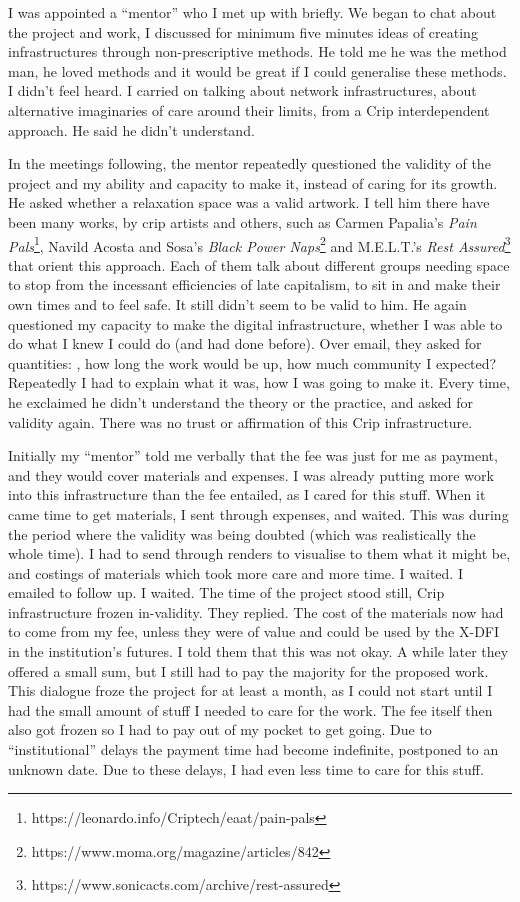 I was appointed a ``mentor'' who I met up with briefly. We began to chat
about the project and work, I discussed for minimum five minutes ideas
of creating infrastructures through non-prescriptive methods. He told me
he was the method man, he loved methods and it would be great if I could
generalise these methods. I didn't feel heard. I carried on talking
about network infrastructures, about alternative imaginaries of care
around their limits, from a Crip interdependent approach. He said he
didn't understand.

In the meetings following, the mentor repeatedly questioned the validity
of the project and my ability and capacity to make it, instead of caring
for its growth. He asked whether a relaxation space was a valid artwork.
I tell him there have been many works, by crip artists and others, such
as Carmen Papalia's \emph{Pain Pals}\footnote{https://leonardo.info/Criptech/eaat/pain-pals},
Navild Acosta and Sosa's \emph{Black Power Naps}\footnote{https://www.moma.org/magazine/articles/842}
and M.E.L.T.'s \emph{Rest Assured}\footnote{https://www.sonicacts.com/archive/rest-assured}
that orient this approach. Each of them talk about different groups
needing space to stop from the incessant efficiencies of late
capitalism, to sit in and make their own times and to feel safe. It
still didn't seem to be valid to him. He again questioned my capacity to
make the digital infrastructure, whether I was able to do what I knew I
could do (and had done before). Over email, they asked for quantities: ,
how long the work would be up, how much community I expected? Repeatedly
I had to explain what it was, how I was going to make it. Every time, he
exclaimed he didn't understand the theory or the practice, and asked for
validity again. There was no trust or affirmation of this Crip
infrastructure.

Initially my ``mentor'' told me verbally that the fee was just for me as
payment, and they would cover materials and expenses. I was already
putting more work into this infrastructure than the fee entailed, as I
cared for this stuff. When it came time to get materials, I sent through
expenses, and waited. This was during the period where the validity was
being doubted (which was realistically the whole time). I had to send
through renders to visualise to them what it might be, and costings of
materials which took more care and more time. I waited. I emailed to
follow up. I waited. The time of the project stood still, Crip
infrastructure frozen in-validity. They replied. The cost of the
materials now had to come from my fee, unless they were of value and
could be used by the X-DFI in the institution's futures. I told them
that this was not okay. A while later they offered a small sum, but I
still had to pay the majority for the proposed work. This dialogue froze
the project for at least a month, as I could not start until I had the
small amount of stuff I needed to care for the work. The fee itself then
also got frozen so I had to pay out of my pocket to get going. Due to
``institutional'' delays the payment time had become indefinite,
postponed to an unknown date. Due to these delays, I had even less time
to care for this stuff.

